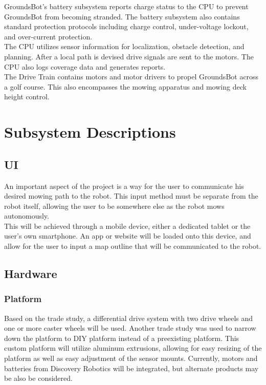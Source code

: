 \documentclass[12pt]{extarticle}
\begin{document}
  GroundsBot's battery subsystem reports charge status to the CPU to prevent GroundsBot from becoming stranded. The battery subsystem also contains standard protection protocols including charge control, under-voltage lockout, and over-current protection. \\

  The CPU utilizes sensor information for localization, obstacle detection, and planning.  After a local path is devised drive signals are sent to the motors. The CPU also logs coverage data and generates reports.\\

  The Drive Train contains motors and motor drivers to propel GroundsBot across a golf course.  This also encompasses the mowing apparatus and mowing deck height control. \\



\newpage
\section{Subsystem Descriptions}
	\subsection{UI}
	An important aspect of the project is a way for the user to communicate his desired mowing path to the robot. This input method must be separate from the robot itself, allowing the user to be somewhere else as the robot mows autonomously. \\
	
	This will be achieved through a mobile device, either a dedicated tablet or the user's own smartphone. An app or website will be loaded onto this device, and allow for the user to input a map outline that will be communicated to the robot. 
	
	\subsection{Hardware}
		\subsubsection{Platform}
			Based on the trade study, a differential drive system with two drive wheels and one or more caster wheels will be used. Another trade study was used to narrow down the platform to DIY platform instead of a preexisting platform. This custom platform will utilize aluminum extrusions, allowing for easy resizing of the platform as well as easy adjustment of the sensor mounts. Currently, motors and batteries from Discovery Robotics will be integrated, but alternate products may be also be considered. 
			
\end{document}
